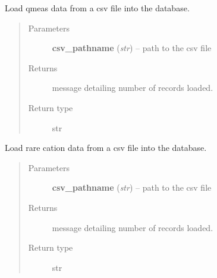 \documentclass[letterpaper,10pt,english]{sphinxmanual}
\begin{document}
\begin{fulllineitems}
\begin{fulllineitems}
\end{fulllineitems}


\begin{fulllineitems}
\label{modules:webb_utils.upload_data.UploadData.load_qmeas_data}
Load qmeas data from a csv file into the database.
\begin{quote}\begin{description}
\item[{Parameters}] \leavevmode
\textbf{csv\_pathname} (\emph{str}) -- path to the csv file

\item[{Returns}] \leavevmode
message detailing number of records loaded.

\item[{Return type}] \leavevmode
str

\end{description}\end{quote}

\end{fulllineitems}


\begin{fulllineitems}
\label{modules:webb_utils.upload_data.UploadData.load_rare_cation_data}
Load rare cation data from a csv file into the database.
\begin{quote}\begin{description}
\item[{Parameters}] \leavevmode
\textbf{csv\_pathname} (\emph{str}) -- path to the csv file

\item[{Returns}] \leavevmode
message detailing number of records loaded.

\item[{Return type}] \leavevmode
str

\end{description}\end{quote}

\end{fulllineitems}



\end{fulllineitems}
\end{document}
